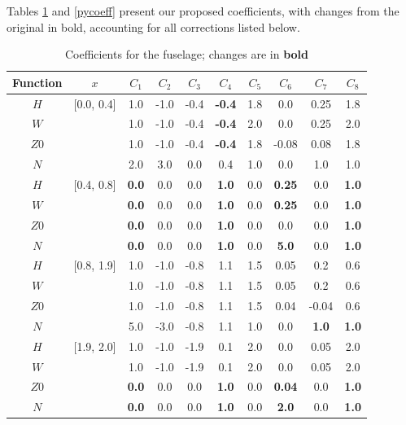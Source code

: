 \documentclass[12pt]{article}
\begin{document}
Tables \ref{fuscoeff} and \ref{pycoeff} present our proposed coefficients, with changes from the original \cite{nasa80051}
in bold, accounting for all corrections listed below.
\begin{table}[!h]
\caption{Coefficients for the fuselage; changes are in \textbf{bold}}
\centering
\begin{tabular}{cccccccccc}
Function & $x$ & $C_{1}$ & $C_{2}$ & $C_{3}$ & $C_{4}$ & $C_{5}$ & $C_{6}$ & $C_{7}$ & $C_{8}$ \\
\hline
$H$          & [0.0, 0.4]  & 1.0 & -1.0 & -0.4 & \textbf{-0.4} & 1.8 & 0.0    & 0.25 & 1.8 \\
$W$          &             & 1.0 & -1.0 & -0.4 & \textbf{-0.4} & 2.0 & 0.0    & 0.25 & 2.0 \\
$Z0$ &                & 1.0 & -1.0 & -0.4 & \textbf{-0.4} & 1.8 & -0.08 & 0.08 & 1.8 \\
$N$           &            & 2.0 & 3.0  & 0.0  &              0.4  & 1.0 & 0.0    & 1.0   & 1.0 \\
\hline
$H$          & [0.4, 0.8]  & \textbf{0.0} & 0.0 & 0.0 & \textbf{1.0} & 0.0 & \textbf{0.25} & 0.0 & \textbf{1.0} \\
$W$          &             & \textbf{0.0} & 0.0 & 0.0 & \textbf{1.0} & 0.0 & \textbf{0.25} & 0.0 & \textbf{1.0} \\
$Z0$ &                & \textbf{0.0} & 0.0 & 0.0 & \textbf{1.0} & 0.0 & 0.0               & 0.0 & \textbf{1.0} \\
$N$           &            & \textbf{0.0} & 0.0 & 0.0 & \textbf{1.0} & 0.0 & \textbf{5.0}   & 0.0 & \textbf{1.0} \\
\hline
$H$          & [0.8, 1.9]  & 1.0 & -1.0 & -0.8 & 1.1 & 1.5 & 0.05 & 0.2 & 0.6 \\
$W$          &             & 1.0 & -1.0 & -0.8 & 1.1 & 1.5 & 0.05 & 0.2 & 0.6 \\
$Z0$ &                & 1.0 & -1.0 & -0.8 & 1.1 & 1.5 & 0.04 & -0.04 & 0.6 \\
$N$           &            & 5.0 & -3.0 & -0.8 & 1.1 & 1.0 & 0.0 & \textbf{1.0} & \textbf{1.0} \\
\hline
$H$          & [1.9, 2.0]  & 1.0 & -1.0 & -1.9 & 0.1 & 2.0 & 0.0 & 0.05 & 2.0 \\
$W$          &             & 1.0 & -1.0 & -1.9 & 0.1 & 2.0 & 0.0 & 0.05 & 2.0 \\
$Z0$ &                & \textbf{0.0} & 0.0 & 0.0 & \textbf{1.0} & 0.0 & \textbf{0.04} & 0.0 & \textbf{1.0} \\
$N$           &            & \textbf{0.0} & 0.0 & 0.0 & \textbf{1.0} & 0.0 & \textbf{2.0} & 0.0 & \textbf{1.0} \\
\end{tabular}
\label{fuscoeff}
\end{table}
\end{document}
